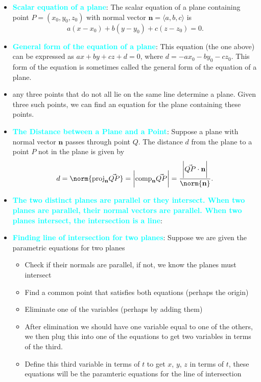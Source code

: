 \documentclass{report}
\begin{document}
\begin{itemize}
    \item \textbf{\textcolor{cyan}{Scalar equation of a plane}}:
        The scalar equation of a plane containing point $P=(x_0, y_0, z_0)$ with normal vector $\mathbf{n}=\langle a, b, c \rangle$ is
        \[
            a(x-x_0) + b(y-y_0) + c(z-z_0) = 0.
        \]
    \item \textbf{\textcolor{cyan}{General form of the equation of a plane}}:
        This equation (the one above) can be expressed as $ax + by + cz + d = 0$, where $d = -ax_0 - by_0 - cz_0$. This form of the equation is sometimes called the general form of the equation of a plane.
    \item any three points that do not all lie on the same line determine a plane. Given three such points, we can find an equation for the plane containing these points.
    \item \textbf{\textcolor{cyan}{The Distance between a Plane and a Point}}: 
        Suppose a plane with normal vector  $\mathbf{n}$ passes through point  $Q$. The distance  $d$ from the plane to a point  $P$ not in the plane is given by
        \begin{align*}
             d = \norm{\text{proj}_{\mathbf{n}}\vec{QP}} = \bigg\lvert \text{comp}_{\mathbf{n}}\vec{QP} \bigg\rvert = \frac{\bigg\lvert \vec{QP} \cdot \mathbf{n} \bigg\rvert}{\norm{\mathbf{n}}}
        .\end{align*}
    \item \textbf{\textcolor{cyan}{The two distinct planes are parallel or they intersect. When two planes are parallel, their normal vectors are parallel. When two planes intersect, the intersection is a line}}:
    \item \textbf{\textcolor{cyan}{Finding line of intersection for two planes}}: Suppose we are given the parametric equations for two planes
        \begin{itemize}
            \item Check if their normals are parallel, if not, we know the planes must intersect
            \item Find a common point that satisfies both equations (perhaps the origin)
            \item Eliminate one of the variables (perhaps by adding them)
            \item After elimination we should have one variable equal to one of the others, we then plug this into one of the equations to get two variables in terms of the third.
            \item Define this third variable in terms of $t$ to get $x$, $y$, $z$ in terms of $t$, these equations will be the paramteric equations for the line of intersection

\end{itemize}
\end{itemize}
\end{document}
